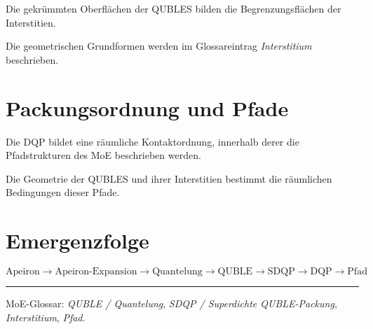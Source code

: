 \documentclass[11pt,a4paper]{article}
\begin{document}
Die gekrümmten Oberflächen der QUBLES
bilden die Begrenzungsflächen der
Interstitien.

Die geometrischen Grundformen werden
im Glossareintrag \emph{Interstitium}
beschrieben.

\section*{Packungsordnung und Pfade}

Die DQP bildet eine räumliche
Kontaktordnung, innerhalb derer die
Pfadstrukturen des MoE beschrieben werden.

Die Geometrie der QUBLES und ihrer
Interstitien bestimmt die räumlichen
Bedingungen dieser Pfade.

\section*{Emergenzfolge}

\[
\text{Apeiron}
\rightarrow
\text{Apeiron-Expansion}
\rightarrow
\text{Quantelung}
\rightarrow
\text{QUBLE}
\rightarrow
\text{SDQP}
\rightarrow
\text{DQP}
\rightarrow
\text{Pfad}
\]

\vspace{0.9em}
\hrule
\vspace{0.45em}

{\footnotesize
MoE-Glossar:
\emph{QUBLE / Quantelung},
\emph{SDQP / Superdichte QUBLE-Packung},
\emph{Interstitium},
\emph{Pfad}.
}
\end{document}
